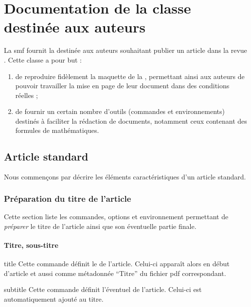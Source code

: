 \chapter{Documentation de la classe destinée aux auteurs}
\label{cha:documentation-auteurs}

La \gls{smf} fournit la  destinée aux auteurs souhaitant publier
un article dans la revue \gzt*{}. Cette classe a pour but :
\begin{enumerate}
\item de reproduire fidèlement la maquette de la \gzt{}, permettant ainsi
  aux auteurs de pouvoir travailler la mise en page de leur document dans des
  conditions réelles ;
\item de fournir un certain nombre d'outils (commandes et environnements)
  destinés à faciliter la rédaction de documents, notamment ceux contenant des
  formules de mathématiques.
\end{enumerate}

\section{Article standard}
\label{sec:article-standard}

Nous commençons par décrire les éléments caractéristiques d'un article standard.

\subsection{Préparation du titre de l'article}
\label{sec:prep-de-lart}

Cette section liste les commandes, options et environnement permettant de
\emph{préparer} le titre de l'article ainsi que son éventuelle partie finale.

\subsubsection{Titre, sous-titre}
\label{sec:titre}

\begin{docCommand}[doc description=\string!]{title}{}
  Cette commande définit le  de l'article. Celui-ci apparaît alors
  en début d'article et aussi comme métadonnée \enquote{Titre} du fichier
  \acrshort{pdf} correspondant.
\end{docCommand}

\begin{docCommand}{subtitle}{}
  Cette commande définit l'éventuel  de l'article. Celui-ci
  est automatiquement ajouté au titre.
\end{docCommand}

